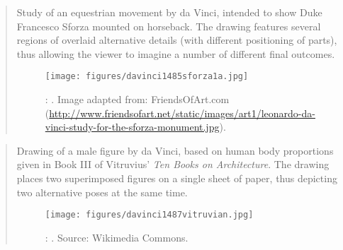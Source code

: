 {}
		\begin{quote}
		\small
		Study of an equestrian movement by da Vinci, intended to show Duke Francesco Sforza mounted on horseback.
		The drawing features several regions of overlaid alternative details (with different positioning of parts),
		thus allowing the viewer to imagine a number of different final outcomes.
		\begin{figure}[htb]
		\begin{center}
		\texttt{[image: figures/davinci1485sforza1a.jpg]}
		\caption{
		\citeauthor{davinci1485sforza}: 
		\cite{davinci1485sforza}.
		Image adapted from: 
		FriendsOfArt.com (\url{http://www.friendsofart.net/static/images/art1/leonardo-da-vinci-study-for-the-sforza-monument.jpg}).}		
		\label{fig:davinci1485sforza}
		\end{center}
		\end{figure}		
		\end{quote}

\clearpage
{}
		\begin{quote}
		\small
		Drawing of a male figure by da Vinci, based on human body proportions given in Book III of Vitruvius' {\em Ten Books on Architecture}. 
		The drawing places two superimposed figures on a single sheet of paper,
		thus depicting two alternative poses at the same time.
		\begin{figure}[htb]
		\begin{center}
		\texttt{[image: figures/davinci1487vitruvian.jpg]}
		\caption{
		\citeauthor{davinci1487vitruvian}: 
		\cite{davinci1487vitruvian}.
		Source: Wikimedia Commons.}		
		\label{fig:davinci1487vitruvian}
		\end{center}
		\end{figure}		
		\end{quote}

